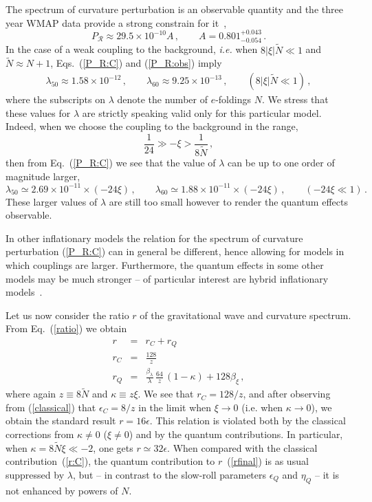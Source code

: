  The spectrum of curvature perturbation is an observable quantity and
the three year WMAP data provide a strong
constrain for it~\cite{Spergel:2006},
\begin{equation}
P_{\mathcal{R}} \approx 29.5\times 10^{-10}A\,,
\label{P_R:obs}
\qquad
A = 0.801^{+0.043}_{-0.054}
\,.
\end{equation}
In the case of a weak coupling to the background,
{\it i.e.} when $8|\xi|\tilde{N}\ll 1$ and $\tilde{N}\approx N+1$,
Eqs.~(\ref{P_R:C}) and (\ref{P_R:obs}) imply
\begin{eqnarray}
\lambda_{50} \approx 1.58\times 10^{-12}\,,\qquad
\lambda_{60} \approx 9.25\times 10^{-13}\,,
\qquad (8|\xi|\tilde{N}\ll 1)
\,,
\end{eqnarray}
where the subscripts on $\lambda$ denote the number of $e$-foldings $N$.
We stress that these values for $\lambda$ are strictly speaking valid only
for this particular model. Indeed, when we choose the coupling to the
background in the range,
\begin{equation}
\frac{1}{24}\gg - \xi > \frac{1}{8\tilde{N}}
\,,
\label{condition:final:2}
\end{equation}
then from Eq.~(\ref{P_R:C}) we see that the value of
$\lambda$ can be up to one order of magnitude larger,
\begin{equation}
  \lambda_{50}\simeq 2.69\times 10^{-11}\times (-24 \xi)
\,,\qquad
  \lambda_{60}\simeq 1.88\times 10^{-11}\times (-24 \xi)
\,,\qquad
(-24 \xi\ll 1)
\,.
\label{lambda50+60:2}
\end{equation}
These larger values of $\lambda$ are still too small
however to render the quantum effects observable.

In other inflationary models the relation for
the spectrum of curvature perturbation
(\ref{P_R:C}) can in general be different, hence allowing for models in
which couplings are larger. Furthermore, the quantum effects in some other
models may be much stronger -- of particular interest are hybrid
inflationary models~\cite{ProkopecBilandzic}.

 Let us now consider the ratio $r$ of the gravitational wave and
curvature spectrum. From Eq.~(\ref{ratio}) we obtain
\begin{eqnarray}
r &=& r_C + r_Q
\nonumber\\
r_C &=& \frac{128}{z}
\label{r:C}
\\
r_Q &=& \frac{\beta_{\lambda}}{\lambda}\,\frac{64}{z}\,(1-\kappa) +
       128\beta_{\xi}
\,,
\label{rfinal}
\end{eqnarray}
where again $z\equiv 8\tilde{N}$ and  $\kappa\equiv z\xi$. We see
that $r_C = {128}/{z}$, and after observing from
(\ref{classical}) that $\epsilon_C = {8}/{z}$ in the limit
when $\xi\rightarrow 0$ (i.e. when $\kappa\rightarrow 0$), we
obtain the standard result $r=16\epsilon$.
This relation is violated both by the classical corrections
from  $\kappa\neq 0$ ($\xi\neq 0$) and by the quantum contributions.
In particular, when $\kappa= 8\tilde{N}\xi \ll -2$, one gets
$r\simeq 32\epsilon$. When compared with the classical
contribution~(\ref{r:C}), the quantum contribution to
 $r$~(\ref{rfinal}) is as usual suppressed
by $\lambda$, but --  in contrast to the slow-roll
 parameters $\epsilon_Q$ and $\eta_Q$ --
 it is not enhanced by powers of $N$.

